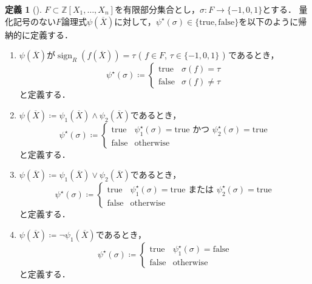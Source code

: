 \documentclass[uplatex, dvipdfmx]{jsarticle}
\numberwithin{equation}{section}
\newcommand{\Z}{\mathbb{Z}}
\newcommand{\map}[3]{{#1}\colon{#2}\rightarrow{#3}}
\newcommand{\true}{\text{true}}
\newcommand{\false}{\text{false}}
\DeclareMathOperator{\sign}{sign}
\theoremstyle{definition}
\newtheorem{definition}{定義}[section]
\begin{document}
\begin{definition}[{\cite[Notation 11.12]{MR2248869}}]
     $F \subset \Z[X_1, \dots, X_n]$を有限部分集合とし，$\map{\sigma}{F}{\{-1, 0, 1\}}$とする．
     量化記号のない$F$論理式$\psi\left(\overline{X}\right)$に対して，$\psi^\star(\sigma) \in \{\true, \false\}$を以下のように帰納的に定義する．
     \begin{enumerate}
          \item $\psi\left(\overline{X}\right)$が$\sign_R\left(f\left(\overline{X}\right)\right) = \tau$ ( $f \in F$, $\tau \in \{-1, 0, 1\}$ ) であるとき，
          \begin{equation}
               \psi^\star(\sigma)\coloneqq \begin{cases}
                    \true  & \sigma(f)=\tau\\
                    \false & \sigma(f) \neq \tau
               \end{cases}
          \end{equation}
          と定義する．
          \item $\psi\left(\overline{X}\right)\coloneqq \psi_1\left(\overline{X}\right) \land \psi_2\left(\overline{X}\right)$であるとき，
          \begin{equation}
               \psi^\star(\sigma)\coloneqq \begin{cases}
                    \true  & \text{$\psi_1^\star(\sigma)=\true$ かつ $\psi_2^\star(\sigma)=\true$}\\
                    \false & \text{otherwise}
               \end{cases}
          \end{equation}
          と定義する．
          \item $\psi\left(\overline{X}\right)\coloneqq \psi_1\left(\overline{X}\right) \lor \psi_2\left(\overline{X}\right)$であるとき，
          \begin{equation}
               \psi^\star(\sigma)\coloneqq \begin{cases}
                    \true  & \text{$\psi_1^\star(\sigma)=\true$ または $\psi_2^\star(\sigma)=\true$}\\
                    \false & \text{otherwise}
               \end{cases}
          \end{equation}
          と定義する．
          \item $\psi\left(\overline{X}\right)\coloneqq \lnot \psi_1\left(\overline{X}\right)$であるとき，
          \begin{equation}
               \psi^\star(\sigma)\coloneqq \begin{cases}
                    \true  & \text{$\psi_1^\star(\sigma)=\false$}\\
                    \false & \text{otherwise}
               \end{cases}
          \end{equation}
          と定義する．
     \end{enumerate}
\end{definition}
\end{document}
